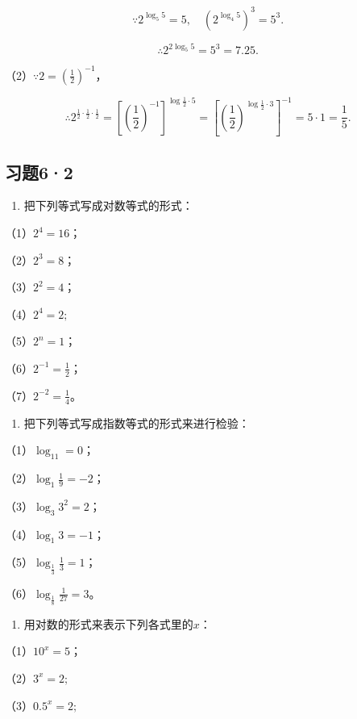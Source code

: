 \[
\because 2^{\log_{5} 5} = 5, \quad (2^{\log_{4} 5})^{3} = 5^{3}.
\]

\[
\therefore 2^{2 \log_{5} 5} = 5^{3} = 7.25.
\]

（2）\(\because 2 = \left(\frac{1}{2}\right)^{-1}\)，

\[
\therefore 2^{\frac{1}{2} \cdot \frac{1}{2} \cdot \frac{1}{2}} = \left[ \left(\frac{1}{2}\right)^{- 1} \right]^{\log \frac{1}{2} \cdot 5} = \left[ \left(\frac{1}{2}\right)^{\log \frac{1}{2} \cdot 3} \right]^{- 1} = 5 \cdot 1 = \frac{1}{5}.
\]

\subsection{习题6·2}

\begin{enumerate}
\item
  把下列等式写成对数等式的形式：
\end{enumerate}

（1）\(2^{4} = 16\)；

（2）\(2^{3} = 8\)；

（3）\(2^{2} = 4\)；

（4）\(2^{4} = 2;\)

（5）\(2^{n} = 1\)；

（6）\(2^{-1} = \frac{1}{2}\)；

（7）\(2^{-2} = \frac{1}{4}\)。

\begin{enumerate}[start=2]
\item
  把下列等式写成指数等式的形式来进行检验：
\end{enumerate}

（1）\(\log_11 = 0\)；

（2）\(\log_{1} \frac{1}{9} = -2\)；

（3）\(\log_{3} 3^{2} = 2\)；

（4）\(\log_{1} 3 = -1\)；

（5）\(\log_{\frac{1}{3}} \frac{1}{3} = 1\)；

（6）\(\log_{\frac{1}{8}} \frac{1}{27} = 3\)。

\begin{enumerate}[start=3]
\item
  用对数的形式来表示下列各式里的\(x\)：
\end{enumerate}

（1）\(10^{x} = 5\)；

（2）\(3^{x} = 2;\)

（3）\(0.5^{x} = 2;\)

